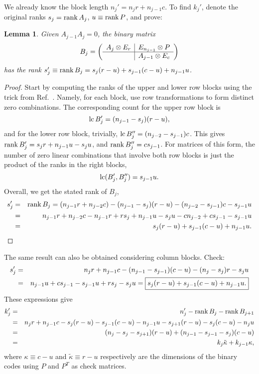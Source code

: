 \documentclass[aps,prb,12pt,tightenlines,%
notitlepage,longbibliography]{revtex4-1}
\newtheorem{lemma}[theorem]{Lemma}
\begin{document}
We already know the block length {$n_j'=n_j r+n_{j-1}c$.}  To
find $k_j'$, denote the original ranks $s_j=\mathop{\rm rank} A_j$,
$u\equiv \mathop{\rm rank} P$, and prove:
\begin{lemma}
  \label{th:rankBj}
  Given $A_{j-1}A_{j}=0$, the  binary matrix
  $$    B_j=\left(
    \begin{array}[c]{c|c}
      A_j\otimes E_r& E_{n_{j-1}}\otimes P\\ \hline%
                    & A_{j-1}\otimes E_c
    \end{array}\right)
  $$
  has the rank $s_j'\equiv \mathop{\rm rank} B_j=s_j (r-u)+s_{j-1}(c-u)+n_{j-1} u$.
\end{lemma}
\begin{proof}
  Start by computing the ranks of the upper and lower row blocks using
  the trick from Ref.~.  Namely, for
  each block, use
  row transformations to form distinct zero combinations.  The
  corresponding count for the upper row block is
$$\mathop{\rm lc} B_j'=(n_{j-1}-s_j)(r-u),$$
and for the lower row block, trivially,
$\mathop{\rm lc} B_j''=(n_{j-2}-s_{j-1}) c$.  This gives
$\mathop{\rm rank} B_j'=s_j r+n_{j-1}u -s_j u$, and $\mathop{\rm rank} B_j''=c s_{j-1}$.  For
matrices of this form, the number of  zero linear
combinations that involve both row blocks is just the product of the
ranks in the right blocks, 
$$
\mathop{\rm lc}(B_j',B_j'')=s_{j-1}u.
$$
Overall, we get the stated rank of $B_j$,
\begin{eqnarray*}
  s_j'&=& \mathop{\rm rank} B_j=(n_{j-1}r+n_{j-2}c)-(n_{j-1}-s_j)(r-u
          )-(n_{j-2}-s_{j-1})c-s_{j-1} u \\ 
      &=& n_{j-1}r +n_{j-2}c -n_{j-1}r+r s_j+n_{j-1} u -s_j u
          -cn_{j-2}+cs_{j-1}-s_{j-1}u \\  
      &=& s_j(r-u )+s_{j-1} (c-u )+n_{j-1}u .      
\end{eqnarray*}
\end{proof}
The same result can also be obtained considering column blocks.
Check:
\begin{eqnarray*}
  s_j'&=&n_j r+n_{j-1}c-(n_{j-1}-s_{j-1})(c-u)-(n_j-s_j)r-s_ju\\
  &=& n_{j-1}u+c s_{j-1}-s_{j-1}u+rs_j-s_j u= 
\framebox{$s_j(r-u )+s_{j-1} (c-u )+n_{j-1}u .$}
\end{eqnarray*}
These expressions give 
\begin{eqnarray}
  \nonumber
  k_j'&=& n_{j}'-\mathop{\rm rank} B_{j}-\mathop{\rm rank} B_{j+1}\\   \nonumber
      &=& n_j r+n_{j-1}c
          - s_{j  }(r-u)-s_{j-1}(c-u)-n_{j-1}u 
          - s_{j+1}(r-u)-s_{j}(c-u)-n_{j}u 
\\ \nonumber 
  &=& (n_j-s_{j}-s_{j+1})(r-u)  +(n_{j-1}-s_{j-1}-s_{j})(c-u) \\
  & =& k_j \tilde{\kappa}+k_{j-1}\kappa,
\label{eq:kj-prime}
\end{eqnarray}
where $\kappa\equiv c-u$ and $\tilde{\kappa}\equiv r-u$ respectively are the
dimensions of the binary codes using $P$ and $P^T$ as check matrices.
\end{document}
